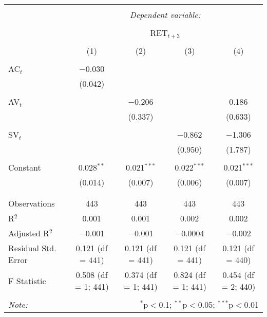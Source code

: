 
\begin{table}[!htbp] \centering 
  \caption{} 
  \label{} 
\begin{tabular}{@{\extracolsep{5pt}}lcccc} 
\\[-1.8ex]\hline 
\hline \\[-1.8ex] 
 & \multicolumn{4}{c}{\textit{Dependent variable:}} \\ 
\cline{2-5} 
\\[-1.8ex] & \multicolumn{4}{c}{RET$_{t+3}$} \\ 
\\[-1.8ex] & (1) & (2) & (3) & (4)\\ 
\hline \\[-1.8ex] 
 AC$_{t}$ & $-$0.030 &  &  &  \\ 
  & (0.042) &  &  &  \\ 
  & & & & \\ 
 AV$_{t}$ &  & $-$0.206 &  & 0.186 \\ 
  &  & (0.337) &  & (0.633) \\ 
  & & & & \\ 
 SV$_{t}$ &  &  & $-$0.862 & $-$1.306 \\ 
  &  &  & (0.950) & (1.787) \\ 
  & & & & \\ 
 Constant & 0.028$^{**}$ & 0.021$^{***}$ & 0.022$^{***}$ & 0.021$^{***}$ \\ 
  & (0.014) & (0.007) & (0.006) & (0.007) \\ 
  & & & & \\ 
\hline \\[-1.8ex] 
Observations & 443 & 443 & 443 & 443 \\ 
R$^{2}$ & 0.001 & 0.001 & 0.002 & 0.002 \\ 
Adjusted R$^{2}$ & $-$0.001 & $-$0.001 & $-$0.0004 & $-$0.002 \\ 
Residual Std. Error & 0.121 (df = 441) & 0.121 (df = 441) & 0.121 (df = 441) & 0.121 (df = 440) \\ 
F Statistic & 0.508 (df = 1; 441) & 0.374 (df = 1; 441) & 0.824 (df = 1; 441) & 0.454 (df = 2; 440) \\ 
\hline 
\hline \\[-1.8ex] 
\textit{Note:}  & \multicolumn{4}{r}{$^{*}$p$<$0.1; $^{**}$p$<$0.05; $^{***}$p$<$0.01} \\ 
\end{tabular} 
\end{table} 
